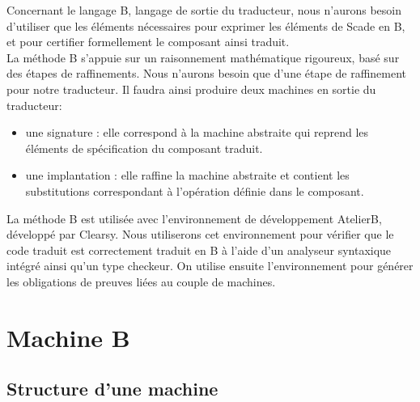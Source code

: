 

Concernant le langage B, langage de sortie du traducteur, nous
n'aurons besoin d'utiliser que les éléments nécessaires pour exprimer
les éléments de Scade en B, et pour certifier formellement le
composant ainsi traduit.\\
La méthode B s'appuie sur un raisonnement mathématique rigoureux, basé
sur des étapes de raffinements. Nous n'aurons besoin que d'une étape de
raffinement pour notre traducteur. Il faudra ainsi produire deux
machines en sortie du traducteur:
\begin{itemize}
\item une signature : elle correspond à la machine abstraite
  qui reprend les éléments de spécification du composant traduit.
\item une implantation : elle raffine la machine abstraite et
  contient les substitutions correspondant à l'opération définie dans
  le composant.
\end{itemize}
La méthode B est utilisée avec l'environnement de développement
AtelierB, développé par Clearsy. Nous utiliserons cet environnement
pour vérifier que le code traduit est correctement traduit en B à
l'aide d'un analyseur syntaxique intégré ainsi qu'un type checkeur. On
utilise ensuite l'environnement pour générer les obligations de
preuves liées au couple de machines.




\section{Machine B}

\subsection{Structure d'une machine}

